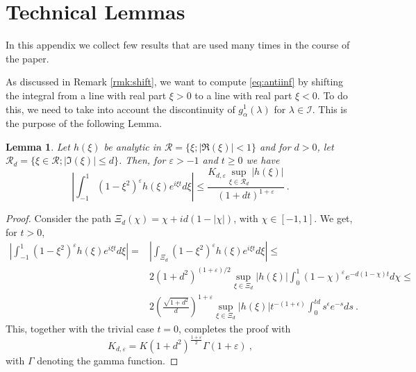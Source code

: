 \documentclass[11pt]{article}
\numberwithin{equation}{section}
\newtheorem{lemma}[theorem]{Lemma}
\numberwithin{theorem}{section}
\newcommand{\e}{\varepsilon}
\begin{document}
\appendix



\section{Technical Lemmas}
\label{app:lemmas}

In this appendix we collect few results that are used many times in the course of the paper.

As discussed in Remark \ref{rmk:shift}, we want to compute \eqref{eq:antiinf} by shifting the integral from a line with
real part $\xi>0$ to a line with real part $\xi<0$. To do this, we need to take into account the discontinuity of
$g^1_\alpha(\lambda)$ for $\lambda\in \mathcal I$. This is the purpose of the following Lemma.

\begin{lemma}\label{lem:stima} 
Let $h(\xi)$ be analytic in $\mathcal R=\{\xi; |\Re(\xi)|< 1\}$ and for $d>0$, let $\mathcal R_d=\{\xi\in \mathcal R;
|\Im(\xi)|\leq d\}$. Then, for $\e>-1$ and $t\ge 0$ we have
\begin{equation}\label{eq:fint}
\left |\int_{-1}^1 (1-\xi^2)^{\e}h(\xi)e^{i \xi t}d\xi\right|\leq
\frac{K_{d,\e}\sup_{\xi\in \mathcal R_d}|h(\xi)|}{\left(1+dt\right)^{1+\e}}\ .
\end{equation}

\end{lemma}

\begin{proof}
Consider the path $\Xi_d(\chi)=\chi+ id(1-|\chi|)$, with
$\chi\in[-1,1]$. We get, for $t>0$, %
\begin{equation}\label{eq:stima}
\begin{aligned}
\left |\int_{-1}^1 (1-\xi^2)^{\e}h(\xi)e^{i \xi t}d\xi\right|
=&\left|\int_{\Xi_d}(1-\xi^2)^\e h(\xi) e^{i\xi t}d\xi\right|\leq\\
&2(1+d^2)^{(1+\e)/2}\sup_{\xi\in \Xi_d}\left|h(\xi)\right|\int_{0}^{1}
(1-\chi)^{\e}e^{-d(1-\chi)t}d\chi\leq\\
&2\left(\frac{\sqrt{1+d^2}}{d}\right)^{1+\e}\sup_{\xi\in \Xi_d}\left|h(\xi)\right|
{t^{-(1+\epsilon)}}\int_0^{td}s^{\epsilon}e^{-s}ds\ .
\end{aligned}
\end{equation}
This, together with the trivial case $t=0$, completes the proof with
\[
K_{d,\e}=K\left(1+d^2\right)^{\frac{1+\e}2}\Gamma(1+\e)\ ,
\]
with $\Gamma$ denoting the gamma function.
\end{proof}
\end{document}
